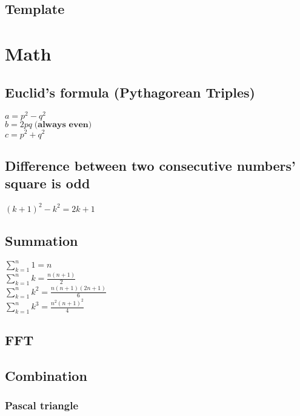 \documentclass[10pt,oneside]{article}
\begin{document}
\begin{landscape}
\begin{multicols}{2}
\subsection{Template}

% 


\section{Math}

\subsection{Euclid's formula (Pythagorean Triples)}

$a = p^2 - q^2 $\\
$b = 2pq \; \textbf{(always even)}$ \\
$c = p^2 + q^2$\\

\subsection{Difference between two consecutive numbers' square is odd}

$(k + 1)^2 - k^2 = 2k + 1$

\subsection{Summation}

$\sum_{k=1}^{n} 1= n$\\
$\sum_{k=1}^{n} k= \frac{n(n+1)}{2}$\\
$\sum_{k=1}^{n} k^2= \frac{n(n+1)(2n+1)}{6}$\\
$\sum_{k=1}^{n} k^3= \frac{n^2(n+1)^2}{4}$\\

\subsection{FFT}


\subsection{Combination}

\subsubsection{Pascal triangle}


\end{multicols}
\end{landscape}
\end{document}
